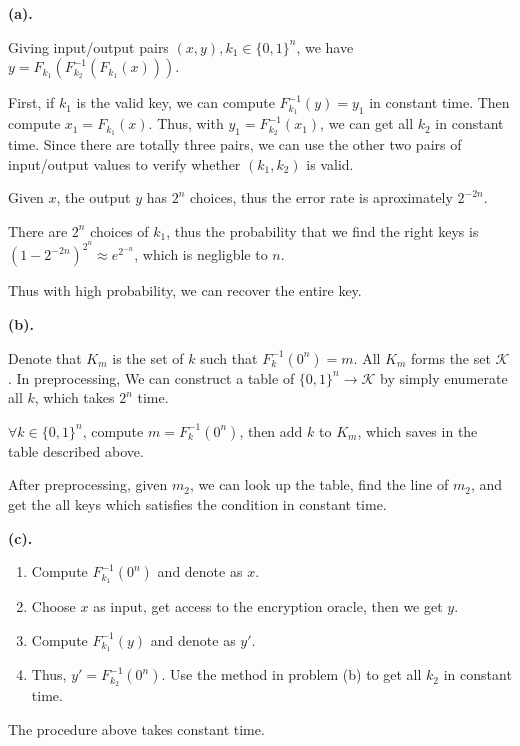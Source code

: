 \documentclass[a4paper]{article}
\newcommand{\K}{\mathcal{K}}
\newenvironment{problem}[2][Problem]{\begin{trivlist}
\item[\hskip \labelsep {\bfseries #1}\hskip \labelsep {\bfseries #2.}]}{\end{trivlist}}
\begin{document}
\begin{problem}{6.13}
\textbf{(a).}\par
Giving input/output pairs $(x,y),k_1\in\{0,1\}^n$, we have $y=F_{k_1}(F_{k_2}^{-1}(F_{k_1}(x)))$.\par
First, if $k_1$ is the valid key, we can compute $F_{k_1}^{-1}(y)=y_1$ in constant time. Then compute $x_1=F_{k_1}(x)$. Thus, with $y_1=F_{k_2}^{-1}(x_1)$, we can get all $k_2$ in constant time. Since there are totally three pairs, we can use the other two pairs of input/output values to verify whether $(k_1,k_2)$ is valid.\par
Given $x$, the output $y$ has $2^n$ choices, thus the error rate is aproximately $2^{-2n}$.\par
There are $2^n$ choices of $k_1$, thus the probability that we find the right keys is $(1-2^{-2n})^{2^{n}}\approx e^{2^{-n}}$, which is negligble to $n$.\par
Thus with high probability, we can recover the entire key.\par\vspace{3ex}

\textbf{(b).}\par
Denote that $K_m$ is the set of $k$ such that $F_{k}^{-1}(0^n)=m$. All $K_m$ forms the set $\K$.
In preprocessing, We can construct a table of $\{0,1\}^n\rightarrow \K$ by simply enumerate all $k$, which takes $2^n$ time.\par
$\forall k\in\{0,1\}^n$, compute $m=F_{k}^{-1}(0^n)$, then add $k$ to $K_m$, which saves in the table described above.\par
After preprocessing, given $m_2$, we can look up the table, find the line of $m_2$, and get the all keys which satisfies the condition in constant time.
\par\vspace{3ex}
\textbf{(c).}\par
\begin{enumerate}
    \item Compute $F_{k_1}^{-1}(0^n)$ and denote as $x$.
    \item Choose $x$ as input, get access to the encryption oracle, then we get $y$.
    \item Compute $F_{k_1}^{-1}(y)$ and denote as $y'$.
    \item Thus, $y'=F_{k_2}^{-1}(0^n)$. Use the method in problem (b) to get all $k_2$ in constant time.
\end{enumerate}
The procedure above takes constant time.
\par\vspace{3ex}


\end{problem}
\end{document}
